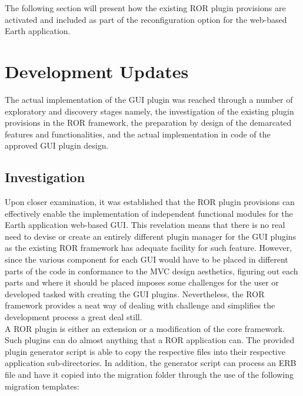 \documentclass{article}
\begin{document}
\noindent
The following section will present how the existing ROR plugin provisions are activated and included as part of the reconfiguration option for the web-based Earth application.


\section{Development Updates} %

\noindent
The actual implementation of the GUI plugin was reached through a number of exploratory and discovery stages namely, the investigation of the existing plugin provisions in the ROR framework, the preparation by design of the demarcated features and functionalities, and the actual implementation in code of the approved GUI plugin design. \\



\subsection{Investigation}

\noindent
Upon closer examination, it was established that the ROR plugin provisions can effectively enable the implementation of independent functional modules for the Earth application web-based GUI. This revelation means that there is no real need to devise or create an entirely different plugin manager for the GUI plugins as the existing ROR framework has adequate facility for such feature. However, since the various component for each GUI would have to be placed in different parts of the code in conformance to the MVC design aesthetics, figuring out each parts and where it should be placed imposes some challenges for the user or developed tasked with creating the GUI plugins. Nevertheless, the ROR framework provides a neat way of dealing with challenge and simplifies the development process a great deal still. \\

\noindent
A ROR plugin is either an extension or a modification of the core framework. Such plugins can do almost anything that a ROR application can. The provided plugin generator script is able to copy the respective files into their respective application sub-directories. In addition, the generator script can process an ERB file and have it copied into the migration folder through the use of the following migration templates: 
\end{document}
